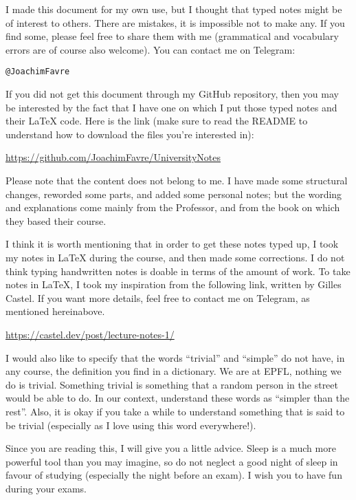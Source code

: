 I made this document for my own use, but I thought that typed notes might be of interest to others. There are mistakes, it is impossible not to make any. If you find some, please feel free to share them with me (grammatical and vocabulary errors are of course also welcome). You can contact me on Telegram:
\begin{center}
    \texttt{@JoachimFavre}
\end{center}

If you did not get this document through my GitHub repository, then you may be interested by the fact that I have one on which I put those typed notes and their \LaTeX{} code. Here is the link (make sure to read the README to understand how to download the files you're interested in):
\begin{center}
    \url{https://github.com/JoachimFavre/UniversityNotes}
\end{center}

Please note that the content does not belong to me. I have made some structural changes, reworded some parts, and added some personal notes; but the wording and explanations come mainly from the Professor, and from the book on which they based their course.

I think it is worth mentioning that in order to get these notes typed up, I took my notes in \LaTeX{} during the course, and then made some corrections. I do not think typing handwritten notes is doable in terms of the amount of work. To take notes in \LaTeX{}, I took my inspiration from the following link, written by Gilles Castel. If you want more details, feel free to contact me on Telegram, as mentioned hereinabove.
\begin{center}
    \url{https://castel.dev/post/lecture-notes-1/}
\end{center}

I would also like to specify that the words ``trivial'' and ``simple'' do not have, in any course, the definition you find in a dictionary. We are at EPFL, nothing we do is trivial. Something trivial is something that a random person in the street would be able to do. In our context, understand these words as ``simpler than the rest''. Also, it is okay if you take a while to understand something that is said to be trivial (especially as I love using this word everywhere!).

Since you are reading this, I will give you a little advice. Sleep is a much more powerful tool than you may imagine, so do not neglect a good night of sleep in favour of studying (especially the night before an exam). I wish you to have fun during your exams.

